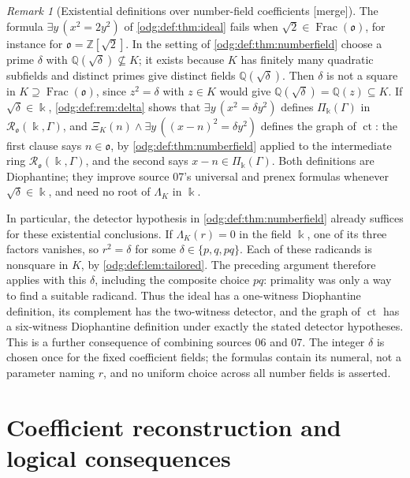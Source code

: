 \documentclass[11pt,oneside]{article}
\numberwithin{equation}{section}
\theoremstyle{definition}
\theoremstyle{remark}
\newtheorem{remark}[remark]{Remark}
\newcommand{\Z}{\mathbb Z}
\newcommand{\Q}{\mathbb Q}
\newcommand{\ct}{\operatorname{ct}}
\newcommand{\Frac}{\operatorname{Frac}}
\newcommand{\mergetag}{\textup{\textsf{\small[merge]}}}
\begin{document}
\begin{remark}[Existential definitions over number-field coefficients \mergetag]\label{odg:def:rem:numberfieldideal}
The formula $\exists y\,(x^2=2y^2)$ of \cref{odg:def:thm:ideal} fails when
$\sqrt2\in\Frac(\mathfrak o)$, for instance for $\mathfrak o=\Z[\sqrt2]$.
In the setting of \cref{odg:def:thm:numberfield} choose a prime $\delta$ with
$\Q(\sqrt\delta)\not\subseteq K$; it exists because $K$ has finitely many
quadratic subfields and distinct primes give distinct fields
$\Q(\sqrt\delta)$. Then $\delta$ is not a square in $K\supseteq\Frac(\mathfrak o)$,
since $z^2=\delta$ with $z\in K$ would give $\Q(\sqrt\delta)=\Q(z)\subseteq K$.
If $\sqrt\delta\in\Bbbk$, \cref{odg:def:rem:delta} shows that
$\exists y\,(x^2=\delta y^2)$ defines $\Pi_\Bbbk(\Gamma)$ in
$\mathcal R_{\mathfrak o}(\Bbbk,\Gamma)$, and
$\Xi_K(n)\wedge\exists y\,((x-n)^2=\delta y^2)$ defines the graph of $\ct$:
the first clause says $n\in\mathfrak o$, by \cref{odg:def:thm:numberfield}
applied to the intermediate ring $\mathcal R_{\mathfrak o}(\Bbbk,\Gamma)$, and
the second says $x-n\in\Pi_\Bbbk(\Gamma)$. Both definitions are Diophantine;
they improve source 07's universal and prenex formulas whenever
$\sqrt\delta\in\Bbbk$, and need no root of $\Lambda_K$ in $\Bbbk$.

In particular, the detector hypothesis in \cref{odg:def:thm:numberfield}
already suffices for these existential conclusions. If
$\Lambda_K(r)=0$ in the field $\Bbbk$, one of its three factors vanishes,
so $r^2=\delta$ for some $\delta\in\{p,q,pq\}$. Each of these radicands is
nonsquare in $K$, by \cref{odg:def:lem:tailored}. The preceding argument
therefore applies with this $\delta$, including the composite choice $pq$:
primality was only a way to find a suitable radicand. Thus the ideal has a
one-witness Diophantine definition, its complement has the two-witness
detector, and the graph of $\ct$ has a six-witness Diophantine definition
under exactly the stated detector hypotheses. This is a further consequence
of combining sources 06 and 07. The integer $\delta$ is chosen once for
the fixed coefficient fields; the formulas contain its numeral, not a
parameter naming $r$, and no uniform choice across all number fields is
asserted.
\end{remark}

\section{Coefficient reconstruction and logical consequences}\label{odg:def:sec:reconstruction}
\end{document}
